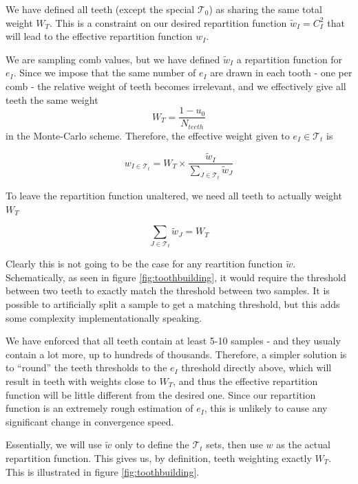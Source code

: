 \documentclass[./thesis.tex]{subfiles}
\begin{document}
We have defined all teeth (except the special $\mathcal{T}_0$) as sharing the same total weight $W_T$. This is a constraint on our desired repartition function $\tilde w_I = C_I^2$ that will lead to the effective repartition function $w_I$.

We are sampling comb values, but we have defined $\tilde w_I$ a repartition function for $e_I$. Since we impose that the same number of $e_I$ are drawn in each tooth - one per comb - the relative weight of teeth becomes irrelevant, and we effectively give all teeth the same weight 
\begin{equation}
W_T=\frac{1-u_0}{N_{teeth}}
\end{equation}
in the Monte-Carlo scheme. Therefore, the effective weight given to $e_I \in \mathcal{T}_t$ is

\begin{equation}
w_{I \in \mathcal{T}_t} = W_T \times \frac{\tilde w_I}{\sum_{J \in \mathcal{T}_t} \tilde w_J}
\end{equation}

To leave the repartition function unaltered, we need all teeth to actually weight $W_T$

\begin{equation}
\sum_{J \in \mathcal{T}_t} \tilde w_J = W_T
\end{equation}

Clearly this is not going to be the case for any reartition function $\tilde w$. Schematically, as seen in figure \ref{fig:toothbuilding}, it would require the threshold between two teeth to exactly match the threshold between two samples. It is possible to artificially split a sample to get a matching threshold, but this adds some complexity implementationally speaking.

We have enforced that all teeth contain at least 5-10 samples - and they usualy contain a lot more, up to hundreds of thousands. Therefore, a simpler solution is to ``round'' the teeth thresholds to the $e_I$ threshold directly above, which will result in teeth with weights close to $W_T$, and thus the effective repartition function will be little different from the desired one. Since our repartition function is an extremely rough estimation of $e_I$, this is unlikely to cause any significant change in convergence speed.

Essentially, we will use $\tilde w$ only to define the $\mathcal{T}_t$ sets, then use $w$ as the actual repartition function. This gives us, by definition, teeth weighting exactly $W_T$.
This is illustrated in figure \ref{fig:toothbuilding}.
 
\end{document}
